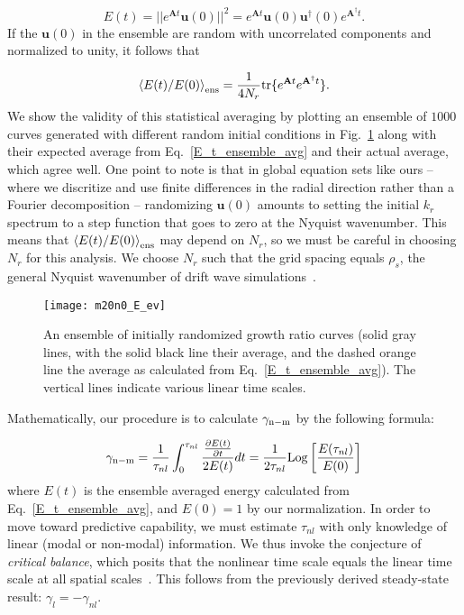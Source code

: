 \documentclass[letter,scriptaddress,twocolumn, prl,showkeys]{revtex4}
\def\beq{\begin{equation}}
\def\eeq{\end{equation}}
\newcommand{\pdiff}[2]{\frac{\partial#1}{\partial#2}}
\begin{document}
\beq
\label{E_t_from_u0}
E(t) = ||e^{\mathbf{A} t} \mathbf{u}(0)||^2 = e^{\mathbf{A} t} \mathbf{u}(0) \mathbf{u}^{\dagger}(0) e^{\mathbf{A}^{\dagger}t}.
\eeq
If the $\mathbf{u}(0)$ in the ensemble are random with uncorrelated components and normalized to unity, it follows that~\cite{camargo1998}

\beq
\label{E_t_ensemble_avg}
\left< E(t)/E(0) \right>_{{\rm{ens}}} = \frac{1}{4 N_r} {\rm{tr}} \{ e^{\mathbf{A} t} e^{\mathbf{A}^{\dagger}t} \}.
\eeq
We show the validity of this statistical averaging by plotting an
ensemble of $1000$ curves generated with different random initial conditions in Fig.~\ref{m20n0_E_ev} along with their expected average from Eq.~\ref{E_t_ensemble_avg} and their actual average,
which agree well.
One point to note is that in global equation sets like ours -- where we discritize and use finite differences in the radial direction rather than a Fourier decomposition -- randomizing $\mathbf{u}(0)$
amounts to setting the initial $k_r$ spectrum to a step function that goes to zero at the Nyquist wavenumber. This means that $\left< E(t)/E(0) \right>_{{\rm{ens}}}$ may depend on $N_r$, so we must be careful in
choosing $N_r$ for this analysis. We choose $N_r$ such that the grid spacing equals $\rho_s$, the general Nyquist wavenumber of drift wave simulations~\cite{scott1992}.

\begin{figure}
\centerline{\texttt{[image: m20n0\_E\_ev]}}
\caption{An ensemble of initially randomized growth ratio curves (solid gray lines, with the solid black line their average, and the dashed orange line the average as calculated from Eq.~\ref{E_t_ensemble_avg}).
The vertical lines indicate various linear time scales.}
\label{m20n0_E_ev}
\end{figure}

Mathematically, our procedure is to calculate $\gamma_{\rm{n-m}}$ by the following formula:

\beq
\label{gamma_l_calc}
\gamma_{\rm{n-m}} = \frac{1}{\tau_{nl}} \int_0^{\tau_{nl}} \frac{\pdiff{E(t)}{t}}{2 E(t)} dt = \frac{1}{2 \tau_{nl}} {\rm{Log}} \left[ \frac{E(\tau_{nl})}{E(0)}\right]
\eeq
where $E(t)$ is the ensemble averaged energy calculated from Eq.~\ref{E_t_ensemble_avg}, and $E(0) = 1$ by our normalization.
In order to move toward predictive capability, we must estimate $\tau_{nl}$ with only knowledge of linear (modal or non-modal) information. 
We thus invoke the conjecture of \emph{critical balance}, which posits that the nonlinear time scale equals the linear time scale at all spatial scales~\cite{schekochihin2012}. This follows from 
the previously derived steady-state result: $\gamma_l = - \gamma_{nl}$. 
\end{document}
